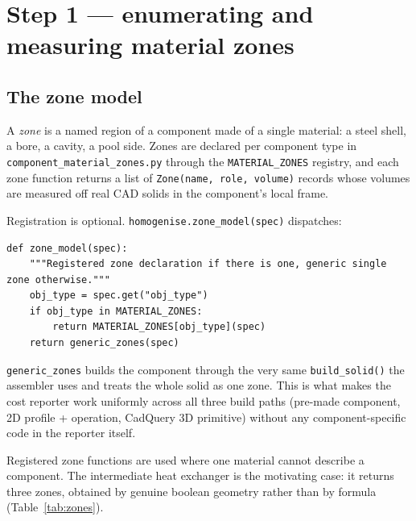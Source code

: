 \documentclass[9pt,a4paper]{extarticle}
\newcommand{\code}[1]{\texttt{\small #1}}
\newcommand{\file}[1]{\texttt{\small #1}}
\begin{document}
\section{Step 1 --- enumerating and measuring material zones}

\subsection{The zone model}

A \emph{zone} is a named region of a component made of a single material: a
steel shell, a bore, a cavity, a pool side. Zones are declared per component
type in \file{component\_material\_zones.py} through the \code{MATERIAL\_ZONES}
registry, and each zone function returns a list of
\code{Zone(name, role, volume)} records whose volumes are measured off real CAD
solids in the component's local frame.

Registration is optional. \code{homogenise.zone\_model(spec)} dispatches:

\begin{lstlisting}[style=py]
def zone_model(spec):
    """Registered zone declaration if there is one, generic single zone otherwise."""
    obj_type = spec.get("obj_type")
    if obj_type in MATERIAL_ZONES:
        return MATERIAL_ZONES[obj_type](spec)
    return generic_zones(spec)
\end{lstlisting}

\code{generic\_zones} builds the component through the very same
\code{build\_solid()} the assembler uses and treats the whole solid as one zone.
This is what makes the cost reporter work uniformly across all three build paths
(pre-made component, 2D profile + operation, CadQuery 3D primitive) without any
component-specific code in the reporter itself.

Registered zone functions are used where one material cannot describe a
component. The intermediate heat exchanger is the motivating case: it returns
three zones, obtained by genuine boolean geometry rather than by formula
(Table~\ref{tab:zones}).
\end{document}
